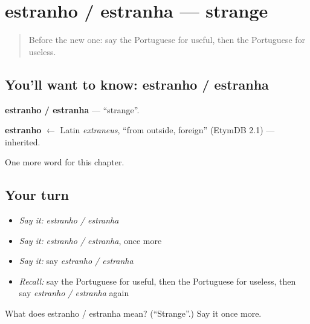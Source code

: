 \section[estranho / estranha]{estranho / estranha — strange}

\label{lesson:PT-C154-estranho-estranha}



\begin{quote}
Before the new one: say the Portuguese for useful, then the Portuguese for useless.
\end{quote}

\subsection*{You'll want to know: estranho / estranha}
\textbf{estranho / estranha} — \textquotedblleft{}strange\textquotedblright{}.

\begin{cousinweb}
\textbf{estranho} $\leftarrow$ Latin \emph{extraneus}, \textquotedblleft{}from outside, foreign\textquotedblright{} (EtymDB 2.1) — inherited.
\end{cousinweb}

\begin{grammarlens}[title={What you've built}]
One more word for this chapter.
\end{grammarlens}

\subsection*{Your turn}
\begin{itemize}
\raggedright
  \item \emph{Say it:} \emph{estranho / estranha}
  \item \emph{Say it:} \emph{estranho / estranha}, once more
  \item \emph{Say it:} say \emph{estranho / estranha}
  \item \emph{Recall:} say the Portuguese for useful, then the Portuguese for useless, then say \emph{estranho / estranha} again
\end{itemize}

\begin{tcolorbox}[breakable,colback=teal!4,colframe=teal!35!black,title={Before you move on}]
What does estranho / estranha mean? (\textquotedblleft{}Strange\textquotedblright{}.) Say it once more.
\end{tcolorbox}
